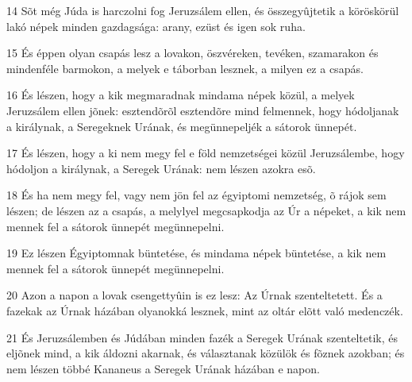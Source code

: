 \par 14 Sõt még Júda is harczolni fog Jeruzsálem ellen, és összegyûjtetik a köröskörül lakó népek minden gazdagsága: arany, ezüst és igen sok ruha.
\par 15 És éppen olyan csapás lesz a lovakon, öszvéreken, tevéken, szamarakon és mindenféle barmokon, a melyek e táborban lesznek, a milyen ez a csapás.
\par 16 És lészen, hogy a kik megmaradnak mindama népek közül, a melyek Jeruzsálem ellen jõnek: esztendõrõl esztendõre mind felmennek, hogy hódoljanak a királynak, a Seregeknek Urának, és megünnepeljék a sátorok ünnepét.
\par 17 És lészen, hogy a ki nem megy fel e föld nemzetségei közül Jeruzsálembe, hogy hódoljon a királynak, a Seregek Urának: nem lészen azokra esõ.
\par 18 És ha nem megy fel, vagy nem jön fel az égyiptomi nemzetség, õ rájok sem lészen; de lészen az a csapás, a melylyel megcsapkodja az Úr a népeket, a kik nem mennek fel a sátorok ünnepét megünnepelni.
\par 19 Ez lészen Égyiptomnak büntetése, és mindama népek büntetése, a kik nem mennek fel a sátorok ünnepét megünnepelni.
\par 20 Azon a napon a lovak csengettyûin is ez lesz: Az Úrnak szenteltetett. És a fazekak az Úrnak házában olyanokká lesznek, mint az oltár elõtt való medenczék.
\par 21 És Jeruzsálemben és Júdában minden fazék a Seregek Urának szenteltetik, és eljõnek mind, a kik áldozni akarnak, és választanak közülök és fõznek azokban; és nem lészen többé Kananeus a Seregek Urának házában e napon.


